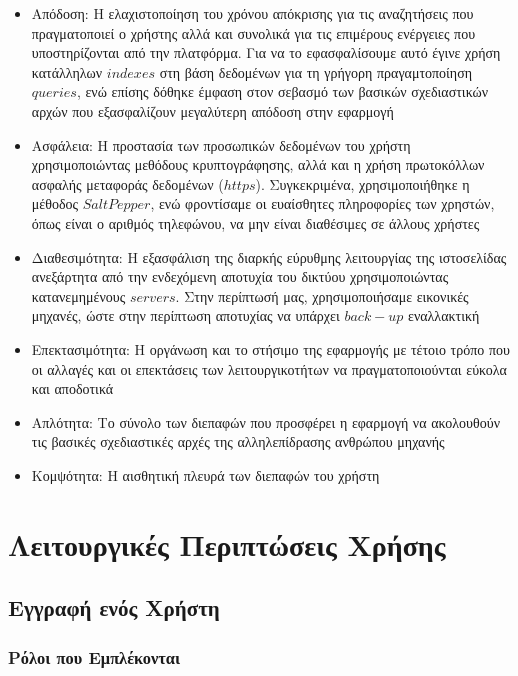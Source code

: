 \documentclass[12pt]{article}
\begin{document}
\begin{itemize}
\item Απόδοση: Η ελαχιστοποίηση του χρόνου απόκρισης για τις αναζητήσεις που πραγματοποιεί ο χρήστης αλλά και συνολικά για τις επιμέρους ενέργειες που υποστηρίζονται από την πλατφόρμα. Για να το εφασφαλίσουμε αυτό έγινε χρήση κατάλληλων $indexes$ στη βάση δεδομένων για τη γρήγορη πραγαμτοποίηση $queries$, ενώ επίσης δόθηκε έμφαση στον σεβασμό των βασικών σχεδιαστικών αρχών που εξασφαλίζουν μεγαλύτερη απόδοση στην εφαρμογή
\item Ασφάλεια: Η προστασία των προσωπικών δεδομένων του χρήστη χρησιμοποιώντας μεθόδους κρυπτογράφησης, αλλά και η χρήση πρωτοκόλλων ασφαλής μεταφοράς δεδομένων ($https$). Συγκεκριμένα, χρησιμοποιήθηκε η μέθοδος $SaltPepper$, ενώ φροντίσαμε οι ευαίσθητες πληροφορίες των χρηστών, όπως είναι ο αριθμός τηλεφώνου, να μην είναι διαθέσιμες σε άλλους χρήστες
\item Διαθεσιμότητα: Η εξασφάλιση της διαρκής εύρυθμης λειτουργίας της ιστοσελίδας ανεξάρτητα από την ενδεχόμενη αποτυχία του δικτύου χρησιμοποιώντας κατανεμημένους $servers$. Στην περίπτωσή μας, χρησιμοποιήσαμε εικονικές μηχανές, ώστε στην περίπτωση αποτυχίας να υπάρχει $back-up$ εναλλακτική
\item Επεκτασιμότητα: Η οργάνωση και το στήσιμο της εφαρμογής με τέτοιο τρόπο που οι αλλαγές και οι επεκτάσεις των λειτουργικοτήτων να πραγματοποιούνται εύκολα και αποδοτικά
\item Απλότητα: Το σύνολο των διεπαφών που προσφέρει η εφαρμογή να ακολουθούν τις βασικές σχεδιαστικές αρχές της αλληλεπίδρασης ανθρώπου μηχανής
\item Κομψότητα: Η αισθητική πλευρά των διεπαφών του χρήστη
\end{itemize}


\newpage

\section{Λειτουργικές Περιπτώσεις Χρήσης}

\subsection{Εγγραφή ενός Χρήστη}

\subsubsection{Ρόλοι που Εμπλέκονται}
\end{document}
